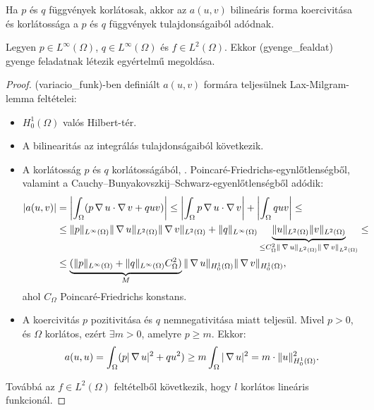 Ha $p$ és $q$ függvények korlátosak, akkor az $a(u,v)$ bilineáris forma koercivitása és korlátossága a $p$ és $q$ függvények tulajdonságaiból adódnak.

\begin{statement}
	Legyen $p \in L^{\infty}(\Omega)$, $q \in L^{\infty}(\Omega)$ és $f \in L^2(\Omega)$. Ekkor \aref({gyenge_fealdat}) gyenge feladatnak létezik egyértelmű megoldása.
\end{statement}

\begin{proof}
	
	\Aref({variacio_funk})-ben definiált $a(u,v)$ formára teljesülnek  Lax-Milgram-lemma feltételei:
	\begin{itemize}
		\item $H^1_0(\Omega)$ valós Hilbert-tér.
		\item A bilinearitás az integrálás tulajdonságaiból következik.
		\item A korlátosság $p$ és $q$ korlátosságából, . Poincaré-Friedrichs-egynlőtlenségből, valamint a Cauchy–Bunyakovszkij–Schwarz-egyenlőtlenségből adódik:
			\begin{align*}
				|a(u,v)| &= \left| \int_{\Omega} (p \operatorname{\nabla} u \cdot \operatorname{\nabla} v + q u v)\right| 
							\leq \left| \int_{\Omega}  p \operatorname{\nabla} u \cdot \operatorname{\nabla} v \right| + \left| \int_{\Omega}  q u v \right| \leq \\ 
						&\leq \|p\|_{L^{\infty}(\Omega)} \| \operatorname{\nabla} u\|_{L^2(\Omega)} \| \operatorname{\nabla} v\|_{L^2(\Omega)} + \|q\|_{L^{\infty}(\Omega)} \underbrace{\| u\|_{L^2(\Omega)} \| v\|_{L^2(\Omega)} }_{\leq C_{\Omega}^2 \| \operatorname{\nabla} u\|_{L^2(\Omega)} \| \operatorname{\nabla} v\|_{L^2(\Omega)}} \leq\\
						&\leq \underbrace{(\|p\|_{L^{\infty}(\Omega)} + \|q\|_{L^{\infty}(\Omega)} C_{\Omega}^2)}_{M} \| \operatorname{\nabla} u\|_{H^1_0(\Omega)} \| \operatorname{\nabla} v\|_{H^1_0(\Omega)},
			\end{align*} 
			ahol $C_{\Omega}$ Poincaré-Friedrichs konstans.
		\item A koercivitás $p$ pozitivitása és $q$ nemnegativitása miatt teljesül. Mivel $p > 0$, és $\Omega$ korlátos, ezért $\exists m > 0 $, amelyre $p \geq m$. Ekkor:
			\begin{equation*}
				a(u,u) =  \int_{\Omega} (p |\operatorname{\nabla} u|^2 + q u^2) \geq m  \int_{\Omega} |\operatorname{\nabla} u|^2 = m  \cdot \|u\|_{H_0^1(\Omega)}^2.
			\end{equation*}
	\end{itemize}
	Továbbá az  $f \in L^2(\Omega)$ feltételből következik, hogy $l$ korlátos lineáris funkcionál.
	
\end{proof}

